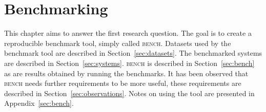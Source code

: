 \chapter{Benchmarking}
\label{ch:benchmarking}

This chapter aims to answer the first research question.
The goal is to create a reproducible benchmark tool, simply called \textsc{bench}.
Datasets used by the benchmark tool are described in Section~\ref{sec:datasets}.
The benchmarked systems are described in Section~\ref{sec:systems}.
\textsc{bench} is described in Section~\ref{sec:bench} as are results obtained by running the benchmarks.
It has been observed that \textsc{bench} needs further requirements to be more useful, these requirements are described in Section~\ref{sec:observations}.
Notes on using the tool are presented in Appendix~\ref{sec:bench}.








